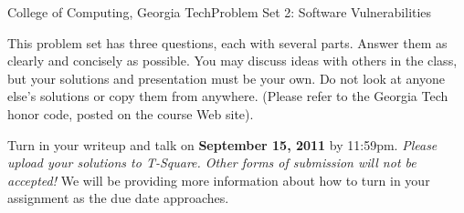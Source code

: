 \documentclass[11pt]{article}
\begin{document}

{College of Computing, Georgia Tech}{Problem Set 2: Software Vulnerabilities}

This problem set has three questions, each with several parts.  Answer
them as clearly and concisely as possible.  You may discuss ideas with
others in the class, but your solutions and presentation must be your
own.  Do not look at anyone else's solutions or copy them from
anywhere. (Please refer to the Georgia Tech honor code, posted on the
course Web site).

Turn in your writeup and talk on {\bf September 15, 2011} by 11:59pm.
{\em Please upload your solutions to T-Square.  Other forms of
  submission will not be accepted!}  We will be providing more
information about how to turn in your assignment as the due date
approaches.
\end{document}

